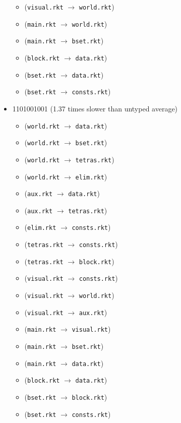 \documentclass{article}
\newcommand{\mono}[1]{\texttt{#1}}
\begin{document}
\begin{itemize}
\begin{itemize}
  \item (\mono{visual.rkt} $\rightarrow$ \mono{world.rkt})
  \item (\mono{main.rkt} $\rightarrow$ \mono{world.rkt})
  \item (\mono{main.rkt} $\rightarrow$ \mono{bset.rkt})
  \item (\mono{block.rkt} $\rightarrow$ \mono{data.rkt})
  \item (\mono{bset.rkt} $\rightarrow$ \mono{data.rkt})
  \item (\mono{bset.rkt} $\rightarrow$ \mono{consts.rkt})
  \end{itemize}
\item 1101001001 (1.37 times slower than untyped average)
  \begin{itemize}
  \item (\mono{world.rkt} $\rightarrow$ \mono{data.rkt})
  \item (\mono{world.rkt} $\rightarrow$ \mono{bset.rkt})
  \item (\mono{world.rkt} $\rightarrow$ \mono{tetras.rkt})
  \item (\mono{world.rkt} $\rightarrow$ \mono{elim.rkt})
  \item (\mono{aux.rkt} $\rightarrow$ \mono{data.rkt})
  \item (\mono{aux.rkt} $\rightarrow$ \mono{tetras.rkt})
  \item (\mono{elim.rkt} $\rightarrow$ \mono{consts.rkt})
  \item (\mono{tetras.rkt} $\rightarrow$ \mono{consts.rkt})
  \item (\mono{tetras.rkt} $\rightarrow$ \mono{block.rkt})
  \item (\mono{visual.rkt} $\rightarrow$ \mono{consts.rkt})
  \item (\mono{visual.rkt} $\rightarrow$ \mono{world.rkt})
  \item (\mono{visual.rkt} $\rightarrow$ \mono{aux.rkt})
  \item (\mono{main.rkt} $\rightarrow$ \mono{visual.rkt})
  \item (\mono{main.rkt} $\rightarrow$ \mono{bset.rkt})
  \item (\mono{main.rkt} $\rightarrow$ \mono{data.rkt})
  \item (\mono{block.rkt} $\rightarrow$ \mono{data.rkt})
  \item (\mono{bset.rkt} $\rightarrow$ \mono{block.rkt})
  \item (\mono{bset.rkt} $\rightarrow$ \mono{consts.rkt})
  \end{itemize}

\end{itemize}
\end{document}
